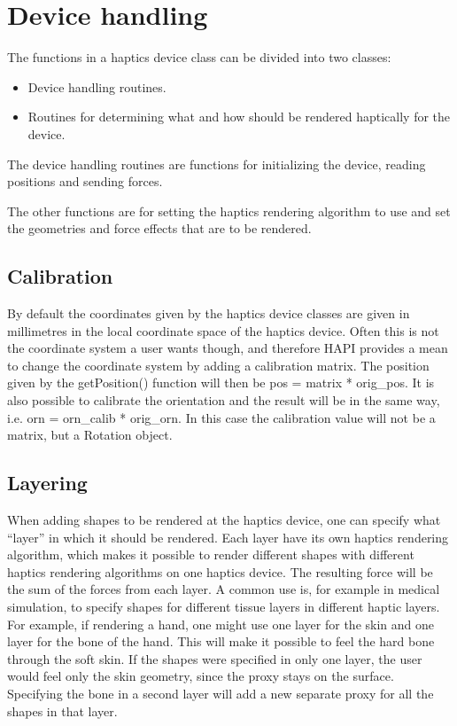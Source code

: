 
\chapter {Device handling}

The functions in a haptics device class can be divided into two classes:

\begin{itemize}
\item Device handling routines.
\item Routines for determining what and how should be rendered haptically
for the device. 
\end{itemize}

The device handling routines are functions for initializing the
device, reading positions and sending forces. 

The other functions are for setting the haptics rendering algorithm
to use and set the geometries and force effects that are to be
rendered.

\section{Calibration}
By default the coordinates given by the haptics device classes are
given in millimetres in the local coordinate space of the haptics
device. Often this is not the coordinate system a user wants
though, and therefore HAPI provides a mean to change the coordinate
system by adding a calibration matrix. The position given by the
getPosition() function will then be pos = matrix * orig\_pos. It is
also possible to calibrate the orientation and the result will be in
the same way, i.e. orn = orn\_calib * orig\_orn. In this case the
calibration value will not be a matrix, but a Rotation object.

\section{Layering}
When adding shapes to be rendered at the haptics device, one can
specify what ``layer'' in which it should be rendered. Each layer have
its own haptics rendering algorithm, which makes it possible to render
different shapes with different haptics rendering algorithms on one
haptics device. The resulting force will be the sum of the forces from
each layer. A common use is, for example in medical simulation, to
specify shapes for different tissue layers in different haptic
layers. For example, if rendering a hand, one might use one layer for
the skin and one layer for the bone of the hand. This will make it
possible to feel the hard bone through the soft skin. If the shapes
were specified in only one layer, the user would feel only the skin
geometry, since the proxy stays on the surface. Specifying the bone in
a second layer will add a new separate proxy for all the shapes in
that layer. 

